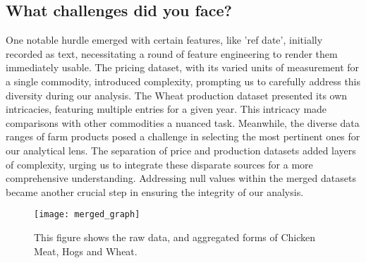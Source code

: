 \subsection{What challenges did you face?}

One notable hurdle emerged with certain features, like 'ref date', initially recorded as text, necessitating a round of feature engineering to render them immediately usable. The pricing dataset, with its varied units of measurement for a single commodity, introduced complexity, prompting us to carefully address this diversity during our analysis. The Wheat production dataset presented its own intricacies, featuring multiple entries for a given year. This intricacy made comparisons with other commodities a nuanced task. Meanwhile, the diverse data ranges of farm products posed a challenge in selecting the most pertinent ones for our analytical lens. The separation of price and production datasets added layers of complexity, urging us to integrate these disparate sources for a more comprehensive understanding. Addressing null values within the merged datasets became another crucial step in ensuring the integrity of our analysis.


\begin{figure}
    \texttt{[image: merged\_graph]}
    \caption{This figure shows the raw data, and aggregated forms of Chicken Meat, Hogs and Wheat.}
    \label{fig:chicken_prices}
\end{figure}

